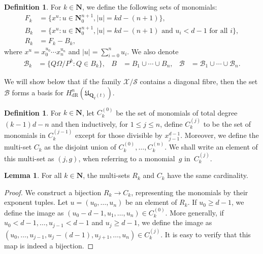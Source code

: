 \documentclass[a4paper,11pt]{article}
\numberwithin{equation}{section}
\providecommand{\abs}[1]{\lvert#1\rvert}                 %
\newcommand{\NN}{\mathbf{N}} %
\newcommand{\QQ}{\mathbf{Q}} %
\renewcommand{\to}{\rightarrow}        %
\providecommand{\HdR}{H_{\text{dR}}}    %
\providecommand{\cB}{\mathcal{B}} %
\theoremstyle{definition}
\newtheorem{lem}[thm]{Lemma}
\newtheorem{defn}[thm]{Definition}
\begin{document}
\begin{defn} \label{defn:MonBasis}
For $k \in \NN$, we define the following sets of monomials: 
\begin{align*}
F_k & = \{ x^u : u \in \mathbf{N}_{0}^{n+1}, \abs{u} = k d - (n+1) \}, \\
B_k & = \{ x^u : u \in \mathbf{N}_{0}^{n+1}, \abs{u} = k d - (n+1) \text{ and $u_i < d-1$ for all $i$}\}, \\
R_k & = F_k - B_k,
\end{align*}
where $x^u = x_0^{u_0} \dotsm x_n^{u_n}$ and $\abs{u}=\sum_{i=0}^n u_i$. 
We also denote 
\begin{align*}
\cB_k &= \{Q \Omega / P^k : Q \in B_k\}, 
&B&     = B_1 \cup \dotsb \cup B_n, 
&\cB&   = \cB_1 \cup \dotsb \cup \cB_n.
\end{align*}
\end{defn}

We will show below that if the family $\mathcal{X}/{\mathcal{S}}$ contains 
a diagonal fibre, then the set $\cB$ forms a basis for $\HdR^n(\mathfrak{U}_{\QQ_q(t)})$.

\begin{defn} \label{defn:IndexSets}
For $k \in \NN$, let $C_k^{(0)}$ be the set of monomials of total 
degree $(k-1)d - n$ and then inductively, for $1 \leq j \leq n$, define 
$C_k^{(j)}$ to be the set of monomials in $C_k^{(j-1)}$ except for those 
divisible by $x_{j-1}^{d-1}$.  Moreover, we define the multi-set $C_k$ as 
the disjoint union of $C_k^{(0)}, \dotsc, C_k^{(n)}$.  We shall write an 
element of this multi-set as $(j, g)$, when referring to a monomial~$g$ 
in~$C_k^{(j)}$.
\end{defn}

\begin{lem} \label{lem:bijection}
For all $k \in \NN$, the multi-sets $R_k$ and $C_k$ 
have the same cardinality.
\end{lem}

\begin{proof}
We construct a bijection $R_k \to C_k$, representing the 
monomials by their exponent tuples.  Let $u = (u_0, \dotsc, u_n)$ be an
element of $R_k$.  If $u_0 \geq d-1$, we define the image as
$(u_0-d-1, u_1, \dotsc, u_n) \in C_k^{(0)}$.  More generally, if 
$u_0 < d-1, \dotsc, u_{j-1} < d-1$ and $u_j \geq d-1$, we define the image as 
$(u_0, \dotsc, u_{j-1}, u_j-(d-1), u_{j+1}, \dotsc, u_n) \in C_k^{(j)}$.  
It is easy to verify that this map is indeed a bijection.
\end{proof}
\end{document}
